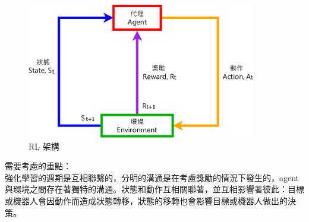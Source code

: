 \documentclass[14pt,a4paper]{report}  %
\begin{document}
\begin{figure}[hbt!]
\begin{center}
\includegraphics[width=10cm]{The_Flow_of_Reinforcement_Learning}
\caption{\Large RL 架構}
\label{RL structur}
\end{center}
\end{figure}

需要考慮的重點：\\
強化學習的週期是互相聯繫的，分明的溝通是在考慮獎勵的情況下發生的，agent與環境之間存在著獨特的溝通。狀態和動作互相關聯著，並互相影響著彼此：目標或機器人會因動作而造成狀態轉移，狀態的移轉也會影響目標或機器人做出的決策。\\
\end{document}
